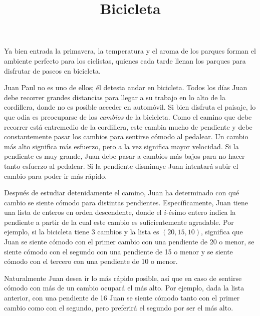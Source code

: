 \documentclass{oci}
\title{Bicicleta}
\begin{document}
\begin{problemDescription}
Ya bien entrada la primavera, la temperatura y el aroma de los parques forman el
ambiente perfecto para los ciclistas, quienes cada tarde llenan los parques para
disfrutar de paseos en bicicleta.

Juan Paul no es uno de ellos; él detesta andar en bicicleta.
Todos los días Juan debe recorrer grandes distancias para llegar a su trabajo en
lo alto de la cordillera, donde no es posible acceder en automóvil.
Si bien disfruta el paisaje, lo que odia es preocuparse de los \emph{cambios} de
la bicicleta.
Como el camino que debe recorrer está entremedio de la cordillera, este cambia
mucho de pendiente y debe constantemente pasar los cambios para sentirse cómodo
al pedalear.
Un cambio más alto significa más esfuerzo, pero a la vez significa mayor
velocidad.
Si la pendiente es muy grande, Juan debe pasar a cambios más bajos para no hacer
tanto esfuerzo al pedalear.
Si la pendiente disminuye Juan intentará subir el cambio para poder ir
más rápido.

Después de estudiar detenidamente el camino, Juan ha determinado con qué cambio
se siente cómodo para distintas pendientes.
Específicamente, Juan tiene una lista de enteros en orden descendente, donde el
$i$-ésimo entero indica la pendiente a partir de la cual este cambio es
suficientemente agradable.
Por ejemplo, si la bicicleta tiene 3 cambios y la lista es $(20, 15, 10)$,
significa que Juan se siente cómodo con el primer cambio con una pendiente de
20 o menor, se siente cómodo con el segundo con una pendiente de 15 o
menor y se siente cómodo con el tercero con una pendiente de 10 o menor.

Naturalmente Juan desea ir lo más rápido posible, así que en caso de sentirse
cómodo con más de un cambio ocupará el más alto.
Por ejemplo, dada la lista anterior, con una pendiente de 16 Juan se siente cómodo
tanto con el primer cambio como con el segundo, pero preferirá el segundo por
ser el más alto.


\end{problemDescription}
\end{document}
